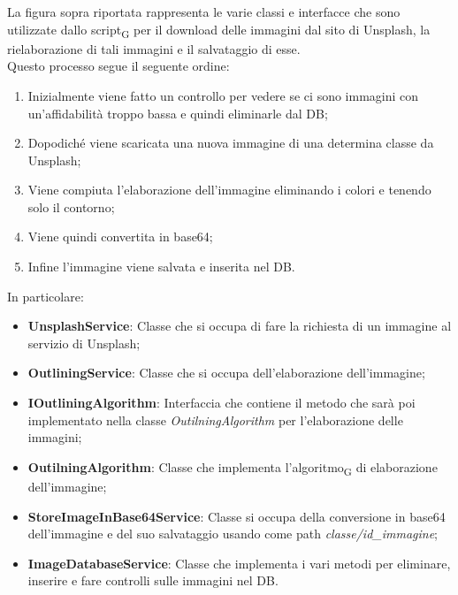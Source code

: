 La figura sopra riportata rappresenta le varie classi e interfacce che sono utilizzate dallo script\textsubscript{G} per il download delle immagini dal sito di Unsplash, la rielaborazione di tali immagini e il salvataggio di esse.\\ Questo processo segue il seguente ordine:
\begin{enumerate}
	\item Inizialmente viene fatto un controllo per vedere se ci sono immagini con un'affidabilità troppo bassa e quindi eliminarle dal DB;
    \item Dopodiché viene scaricata una nuova immagine di una determina classe da Unsplash;
    \item Viene compiuta l'elaborazione dell'immagine eliminando i colori e tenendo solo il contorno;
    \item Viene quindi convertita in base64;
    \item Infine l'immagine viene salvata e inserita nel DB.
\end{enumerate}
\newpage
In particolare:
\begin{itemize}
    \item \textbf{UnsplashService}: Classe che si occupa di fare la richiesta di un immagine al servizio di Unsplash;
    \item \textbf{OutliningService}: Classe che si occupa dell'elaborazione dell'immagine;
    \item \textbf{IOutliningAlgorithm}: Interfaccia che contiene il metodo che sarà poi implementato nella classe \textit{OutilningAlgorithm} per l'elaborazione delle immagini;
    \item \textbf{OutilningAlgorithm}: Classe che implementa l'algoritmo\textsubscript{G} di elaborazione dell'immagine;
    \item \textbf{StoreImageInBase64Service}: Classe si occupa della conversione in base64 dell'immagine e del suo salvataggio usando come path \textit{classe/id\_immagine};
    \item \textbf{ImageDatabaseService}: Classe che implementa i vari metodi per eliminare, inserire e fare controlli sulle immagini nel DB.
\end{itemize}
\newpage
